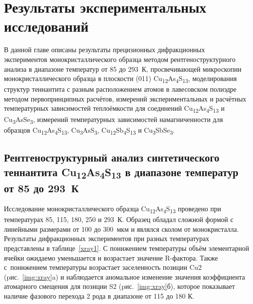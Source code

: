 \chapter{Результаты экспериментальных исследований} \label{chapt3}
В данной главе описаны результаты прецизионных дифракционных экспериментов монокристаллического образца методом рентгеноструктурного анализа в диапазоне температур от 85 до 293~К, просвечивающей микроскопии монокристаллического образца в плоскости (011) Cu\textsubscript{12}As\textsubscript{4}S\textsubscript{13},
моделирования структур теннантита с разным расположением атомов в лавесовском полиэдре методом первопринципных расчётов,
измерений экспериментальных и расчётных температурных зависимостей теплоёмкости для соединений Cu\textsubscript{12}As\textsubscript{4}S\textsubscript{13} и Cu\textsubscript{3}AsSe\textsubscript{3},
измерений температурных зависимостей намагниченности для образцов Cu\textsubscript{12}As\textsubscript{4}S\textsubscript{13}, Cu\textsubscript{3}AsS\textsubscript{3}, Cu\textsubscript{12}Sb\textsubscript{4}S\textsubscript{13} и Cu\textsubscript{3}SbSe\textsubscript{3}.



\section{Рентгеноструктурный анализ синтетического теннантита Cu\textsubscript{12}As\textsubscript{4}S\textsubscript{13} в диапазоне температур от 85 до 293~К} \label{sect3_1}

Исследование монокристаллического образца  Cu\textsubscript{12}As\textsubscript{4}S\textsubscript{13} проведено при температурах 85, 115, 180, 250 и 293~К. Образец обладал сложной формой с линейными размерами от 100 до 300~мкм и являлся сколом от монокристалла.  Результаты дифракционных экспериментов при разных температурах представлены в таблице~\ref{xray1}. С понижением температуры объём элементарной ячейки ожидаемо уменьшается и возрастает значение R-фактора.
Также с~понижением температуры возрастает заселенность позиции Cu2 (pис.~\ref{img:xray}a) и  наблюдается аномальное изменение значения коэффициента атомарного смещения для позиции S2 (pис.~\ref{img:xray}б), которое показывает наличие фазового перехода 2 рода в диапазоне от 115 до 180 К.


